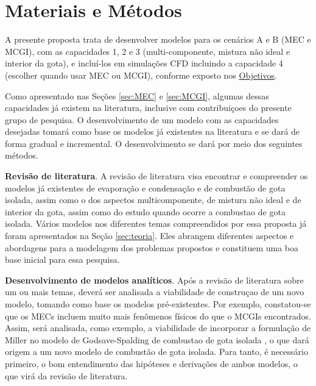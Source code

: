 

\section{Materiais e Métodos}

A presente proposta trata de desenvolver modelos para os cenários A e B (MEC e MCGI), com as capacidades 1, 2 e 3 (multi-componente, mistura não ideal e interior da gota), e incluí-los em simulações CFD incluindo a capacidade 4 (escolher quando usar MEC ou MCGI), conforme exposto nos \hyperref[sec:objetivos]{Objetivos}.

Como apresentado nas Seções \ref{sec:MEC} e \ref{sec:MCGI}, algumas dessas capacidades já existem na literatura, inclusive com contribuiçoes do presente grupo de pesquisa.
O desenvolvimento de um modelo com as capacidades desejadas tomará como base os modelos já existentes na literatura e se dará de forma gradual e incremental.
O desenvolvimento se dará por meio dos seguintes métodos.

\textbf{Revisão de literatura}. 
A revisão de literatura visa encontrar e compreender os modelos já  existentes de evaporação e condensação e de combustão de gota isolada, assim como o dos aspectos multicomponente, de mistura não ideal e de interior da gota, assim como do estudo quando ocorre a combustao de gota isolada.
Vários modelos nos diferentes temas compreendidos por essa proposta já foram apresentados na Seção \ref{sec:teoria}.
Eles abrangem diferentes aspectos e abordagens para a modelagem dos problemas propostos e constituem uma boa base inicial para essa pesquisa. 

\textbf{Desenvolvimento de modelos analíticos}.
Após a revisão de literatura sobre um ou mais temas, deverá ser analisada a viabilidade de construçao de um novo modelo, tomando como base os modelos pré-existentes.
Por exemplo, constatou-se que os MECs incluem muito mais fenômenos físicos do que o MCGIs encontrados. 
Assim, será analisada, como exemplo, a viabilidade de incorporar a formulação de Miller \cite{MillerR1998} no modelo de Godsave-Spalding de combustao de gota isolada \cite{Law1978}, o que dará origem a um novo modelo de combustão de gota isolada.
Para tanto, é necessário primeiro, o bom entendimento das hipóteses e derivações de ambos modelos, o que virá da revisão de literatura.   

